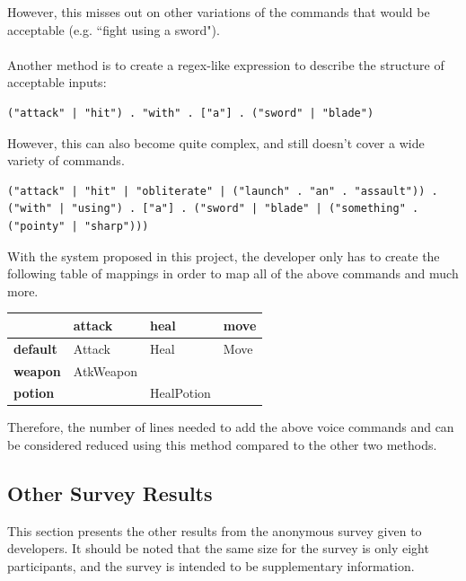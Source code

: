 \documentclass[11pt]{article}
\begin{document}
\begin{appendices}
However, this misses out on other variations of the commands that would be acceptable (e.g. ``fight using a sword").
\\
\\
Another method is to create a regex-like expression to describe the structure of acceptable inputs:

\begin{lstlisting}
("attack" | "hit") . "with" . ["a"] . ("sword" | "blade")
\end{lstlisting}

However, this can also become quite complex, and still doesn't cover a wide variety of commands.

\begin{lstlisting}
("attack" | "hit" | "obliterate" | ("launch" . "an" . "assault")) . ("with" | "using") . ["a"] . ("sword" | "blade" | ("something" . ("pointy" | "sharp")))
\end{lstlisting}

With the system proposed in this project, the developer only has to create the following table of mappings in order to map all of the above commands and much more.

\begin{table}[H]
\centering
\label{comparison-table}
\begin{tabular}{l|l|l|l}
                 & \textbf{attack} & \textbf{heal} & \textbf{move} \\ \hline
\textbf{default} & Attack          & Heal          & Move          \\ \hline
\textbf{weapon}  & AtkWeapon       &               &                 \\ \hline
\textbf{potion}  &                 & HealPotion    & \\
\end{tabular}
\end{table}

Therefore, the number of lines needed to add the above voice commands and can be considered reduced using this method compared to the other two methods.

\newpage
\subsection{Other Survey Results}
\label{appendix:survey-results}

This section presents the other results from the anonymous survey given to developers. It should be noted that the same size for the survey is only eight participants, and the survey is intended to be supplementary information.


\end{appendices}
\end{document}
